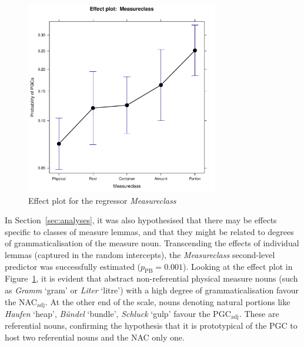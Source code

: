 \documentclass[USenglish]{article}
\newcommand{\Sub}[1]{\ensuremath{\mathrm{_{#1}}}}
\newcommand{\NACa}{NAC\Sub{adj}}
\newcommand{\PGCa}{PGC\Sub{adj}}
\begin{document}

\begin{figure}[h!]
  \centering
  \includegraphics[width=0.75\textwidth]{../R/output/corpus_Measureclass}
  \caption{Effect plot for the regressor \textit{Measureclass}}
  \label{fig:eff:measureattraction}
\end{figure}

In Section~\ref{sec:analyses}, it was also hypothesised that there may be effects specific to classes of measure lemmas, and that they might be related to degrees of grammaticalisation of the measure noun.
Transcending the effects of individual lemmas (captured in the random intercepts), the \textit{Measureclass} second-level predictor was successfully estimated ($p_{\text{PB}}=0.001$).
Looking at the effect plot in Figure~\ref{fig:eff:measureattraction}, it is evident that abstract non-referential physical measure nouns (such as \textit{Gramm} `gram' or \textit{Liter} `litre') with a high degree of grammaticalisation favour the \NACa.
At the other end of the scale, nouns denoting natural portions like \textit{Haufen} `heap', \textit{Bündel} `bundle', \textit{Schluck} `gulp' favour the \PGCa.
These are referential nouns, confirming the hypothesis that it is prototypical of the PGC to host two referential nouns and the NAC only one.

\end{document}
